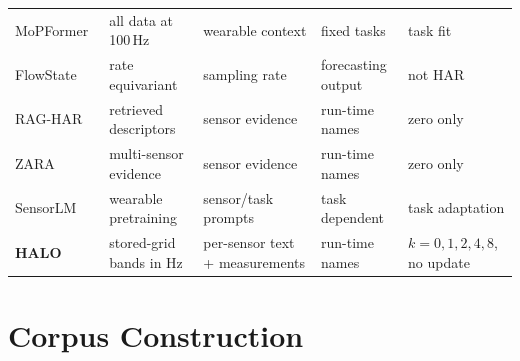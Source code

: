 \begin{table}[t]
\begin{tabularx}{\textwidth}{@{}l
      >{\raggedright\arraybackslash}X
      >{\raggedright\arraybackslash}X
      >{\raggedright\arraybackslash}X
      >{\raggedright\arraybackslash}X@{}}
    MoPFormer~\cite{mopformer} & all data at 100\,Hz & wearable context & fixed tasks & task fit \\
    FlowState~\cite{flowstate} & rate equivariant & sampling rate & forecasting output & not HAR \\
    RAG-HAR~\cite{raghar} & retrieved descriptors & sensor evidence & run-time names & zero only \\
    ZARA~\cite{zara} & multi-sensor evidence & sensor evidence & run-time names & zero only \\
    SensorLM~\cite{sensorlm} & wearable pretraining & sensor/task prompts & task dependent & task adaptation \\
    \midrule
    \textbf{HALO} & stored-grid bands in Hz & per-sensor text + measurements & run-time names & $k=0,1,2,4,8$, no update \\
    \bottomrule
  \end{tabularx}
\end{table}

\section{Corpus Construction}
\label{app:corpus}

